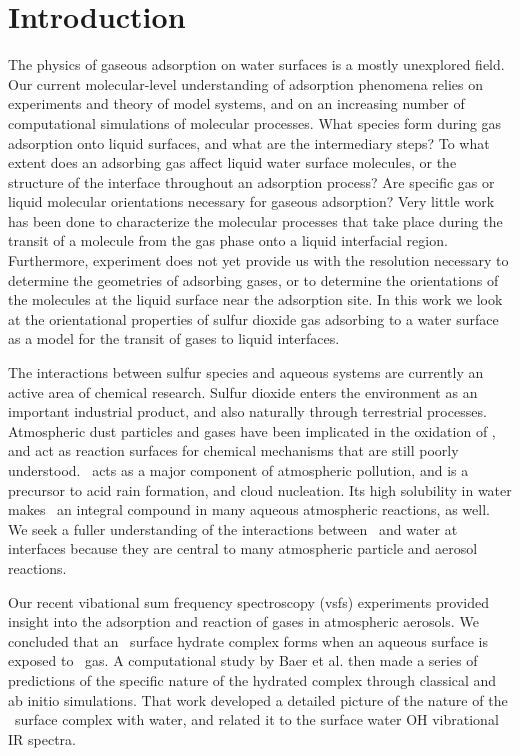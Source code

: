 \section{Introduction}

The physics of gaseous adsorption on water surfaces is a mostly unexplored field. Our current molecular-level understanding of adsorption phenomena relies on experiments and theory of model systems, and on an increasing number of computational simulations of molecular processes. What species form during gas adsorption onto liquid surfaces, and what are the intermediary steps? To what extent does an adsorbing gas affect liquid water surface molecules, or the structure of the interface throughout an adsorption process? Are specific gas or liquid molecular orientations necessary for gaseous adsorption? Very little work has been done to characterize the molecular processes that take place during the transit of a molecule from the gas phase onto a liquid interfacial region. Furthermore, experiment does not yet provide us with the resolution necessary to determine the geometries of adsorbing gases, or to determine the orientations of the molecules at the liquid surface near the adsorption site. In this work we look at the orientational properties of sulfur dioxide gas adsorbing to a water surface as a model for the transit of gases to liquid interfaces.

The interactions between sulfur species and aqueous systems are currently an active area of chemical research. Sulfur dioxide enters the environment as an important industrial product, and also naturally through terrestrial processes. Atmospheric dust particles and gases have been implicated in the oxidation of \suldiox, and act as reaction surfaces for chemical mechanisms that are still poorly understood.\cite{Baltrusaitis2011,Rubasinghege2010,Li2007} \suldiox~acts as a major component of atmospheric pollution, and is a precursor to acid rain formation, and cloud nucleation. Its high solubility in water makes \suldiox~an integral compound in many aqueous atmospheric reactions, as well. We seek a fuller understanding of the interactions between \suldiox~and water at interfaces because they are central to many atmospheric particle and aerosol reactions.

Our recent vibational sum frequency spectroscopy (vsfs) experiments provided insight into the adsorption and reaction of gases in atmospheric aerosols.\cite{Tarbuck2005,Tarbuck2006} We concluded that an \suldiox~surface hydrate complex forms when an aqueous surface is exposed to \suldiox~gas. A computational study by Baer et al.\cite{Baer2010} then made a series of predictions of the specific nature of the hydrated complex through classical and ab initio simulations. That work developed a detailed picture of the nature of the \suldiox~surface complex with water, and related it to the surface water OH vibrational IR spectra.

